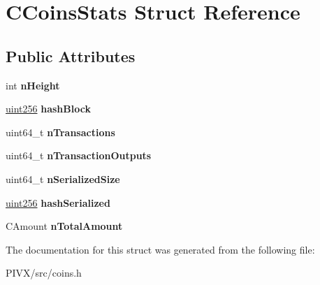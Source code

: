 \hypertarget{struct_c_coins_stats}{}\section{C\+Coins\+Stats Struct Reference}
\label{struct_c_coins_stats}
\subsection*{Public Attributes}
\begin{DoxyCompactItemize}
\item 
\mbox{\label{struct_c_coins_stats_a5972700c4733ce02e12530d758e95d8c}} 
int {\bfseries n\+Height}
\item 
\mbox{\label{struct_c_coins_stats_a75b32757ea85b8df6453490e1acc4607}} 
\mbox{\hyperlink{classuint256}{uint256}} {\bfseries hash\+Block}
\item 
\mbox{\label{struct_c_coins_stats_a0b04da159443c350e9b9e8a39c6a82db}} 
uint64\+\_\+t {\bfseries n\+Transactions}
\item 
\mbox{\label{struct_c_coins_stats_a02612be210ba7c628d04ddedd83b9ff0}} 
uint64\+\_\+t {\bfseries n\+Transaction\+Outputs}
\item 
\mbox{\label{struct_c_coins_stats_ac4302ffc2f8be6e62dbc5655f77e4202}} 
uint64\+\_\+t {\bfseries n\+Serialized\+Size}
\item 
\mbox{\label{struct_c_coins_stats_a0ce8e745d7a62e4ae41f943333c81d7c}} 
\mbox{\hyperlink{classuint256}{uint256}} {\bfseries hash\+Serialized}
\item 
\mbox{\label{struct_c_coins_stats_a97c76344c650e55377d5f9246a906cc4}} 
C\+Amount {\bfseries n\+Total\+Amount}
\end{DoxyCompactItemize}


The documentation for this struct was generated from the following file\+:\begin{DoxyCompactItemize}
\item 
P\+I\+V\+X/src/coins.\+h\end{DoxyCompactItemize}
